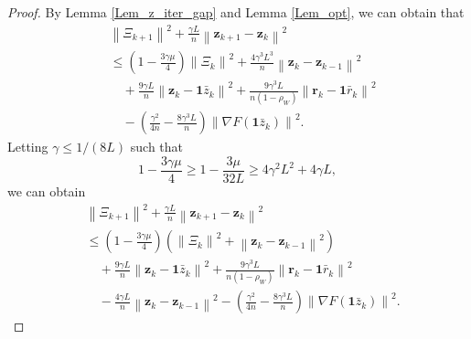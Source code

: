 \documentclass[letterpaper, 10 pt, conference]{ieeeconf}
\begin{document}
\begin{proof}
By Lemma \ref{Lem_z_iter_gap} and Lemma \ref{Lem_opt}, we can obtain that
\begin{equation}
\begin{aligned}
&\left\| \varXi _{k+1} \right\| ^2+\frac{\gamma L}{n}\left\| \mathbf{z}_{k+1}-\mathbf{z}_k \right\| ^2
\\
&\leqslant \left( 1-\frac{3\gamma \mu}{4} \right) \left\| \varXi _k \right\| ^2+\frac{4\gamma ^3L^3}{n}\left\| \mathbf{z}_k-\mathbf{z}_{k-1} \right\| ^2
\\
&\quad +\frac{9\gamma L}{n}\left\| \mathbf{z}_k-\mathbf{1}\bar{z}_k \right\| ^2+\frac{9\gamma ^3L}{n\left( 1-\rho _W \right)}\left\| \mathbf{r}_k-\mathbf{1}\bar{r}_k \right\| ^2
\\
&\quad -\left( \frac{\gamma ^2}{4n}-\frac{8\gamma ^3L}{n} \right) \left\| \nabla F\left( \mathbf{1}\bar{z}_k \right) \right\| ^2.
\end{aligned}
\end{equation}
Letting $\gamma\leqslant 1/(8L)$ such that
\[
1-\frac{3\gamma \mu}{4}\geqslant 1-\frac{3\mu}{32L}\geqslant 4\gamma ^2L^2+4\gamma L,
\]
we can obtain 
\begin{equation}
\begin{aligned}
&\left\| \varXi _{k+1} \right\| ^2+\frac{\gamma L}{n}\left\| \mathbf{z}_{k+1}-\mathbf{z}_k \right\| ^2
\\
&\leqslant \left( 1-\frac{3\gamma \mu}{4} \right) \left( \left\| \varXi _k \right\| ^2+\left\| \mathbf{z}_k-\mathbf{z}_{k-1} \right\| ^2 \right) 
\\
&\quad+\frac{9\gamma L}{n}\left\| \mathbf{z}_k-\mathbf{1}\bar{z}_k \right\| ^2+\frac{9\gamma ^3L}{n\left( 1-\rho _W \right)}\left\| \mathbf{r}_k-\mathbf{1}\bar{r}_k \right\| ^2
\\
&\quad-\frac{4\gamma L}{n}\left\| \mathbf{z}_k-\mathbf{z}_{k-1} \right\| ^2-\left( \frac{\gamma ^2}{4n}-\frac{8\gamma ^3L}{n} \right) \left\| \nabla F\left( \mathbf{1}\bar{z}_k \right) \right\| ^2.
\end{aligned}
\end{equation}


\end{proof}
\end{document}
